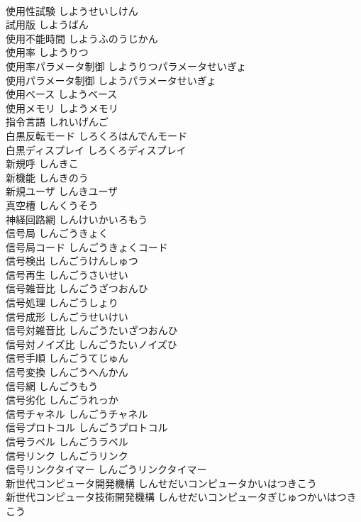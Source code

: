 \documentclass[8pt]{extreport}
\begin{document}
\begin{CJK}{UTF8}{min}
\\	使用性試験	しようせいしけん	
\\	試用版	しようばん	
\\	使用不能時間	しようふのうじかん	
\\	使用率	しようりつ	
\\	使用率パラメータ制御	しようりつパラメータせいぎょ	
\\	使用パラメータ制御	しようパラメータせいぎょ	
\\	使用ベース	しようベース	
\\	使用メモリ	しようメモリ	
\\	指令言語	しれいげんご	
\\	白黒反転モード	しろくろはんでんモード	
\\	白黒ディスプレイ	しろくろディスプレイ	
\\	新規呼	しんきこ	
\\	新機能	しんきのう	
\\	新規ユーザ	しんきユーザ	
\\	真空槽	しんくうそう	
\\	神経回路網	しんけいかいろもう	
\\	信号局	しんごうきょく	
\\	信号局コード	しんごうきょくコード	
\\	信号検出	しんごうけんしゅつ	
\\	信号再生	しんごうさいせい	
\\	信号雑音比	しんごうざつおんひ	
\\	信号処理	しんごうしょり	
\\	信号成形	しんごうせいけい	
\\	信号対雑音比	しんごうたいざつおんひ	
\\	信号対ノイズ比	しんごうたいノイズひ	
\\	信号手順	しんごうてじゅん	
\\	信号変換	しんごうへんかん	
\\	信号網	しんごうもう	
\\	信号劣化	しんごうれっか	
\\	信号チャネル	しんごうチャネル	
\\	信号プロトコル	しんごうプロトコル	
\\	信号ラベル	しんごうラベル	
\\	信号リンク	しんごうリンク	
\\	信号リンクタイマー	しんごうリンクタイマー	
\\	新世代コンピュータ開発機構	しんせだいコンピュータかいはつきこう	
\\	新世代コンピュータ技術開発機構	しんせだいコンピュータぎじゅつかいはつきこう	

\end{CJK}
\end{document}
